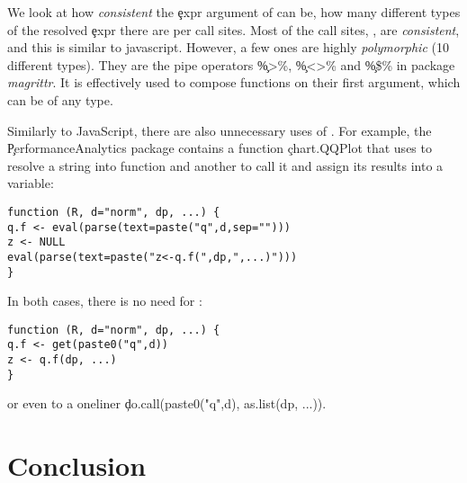 \documentclass[screen,acmsmall]{acmart}
\begin{document}
We look at how \emph{consistent} the \c{expr} argument of \eval can be, \ie how
many different types of the resolved \c{expr} there are per call sites. Most of
the call sites, \ie \PercentMonomorphic, are \emph{consistent}, and this is
similar to javascript. However, a few ones are highly \emph{polymorphic} (10
different types). They are the pipe operators \c{\%>\%}, \c{\%<>\%} and
\c{\%\$\%} in package \emph{magrittr}. It is effectively used to compose
functions on their first argument, which can be of any type.

Similarly to JavaScript, there are also unnecessary uses of \eval. For example,
the \c{PerformanceAnalytics} package contains a function \c{chart.QQPlot} that
uses \eval to resolve a string into function and another to call it and assign
its results into a variable:
\begin{lstlisting}
function (R, d="norm", dp, ...) {
q.f <- eval(parse(text=paste("q",d,sep="")))
z <- NULL
eval(parse(text=paste("z<-q.f(",dp,",...)")))
}
\end{lstlisting}
  In both cases, there is no need for \eval:
\begin{lstlisting}
function (R, d="norm", dp, ...) {
q.f <- get(paste0("q",d))
z <- q.f(dp, ...)
}
\end{lstlisting}
  or even to a oneliner \c{do.call(paste0("q",d), as.list(dp, ...))}.



\section{Conclusion}




\end{document}
